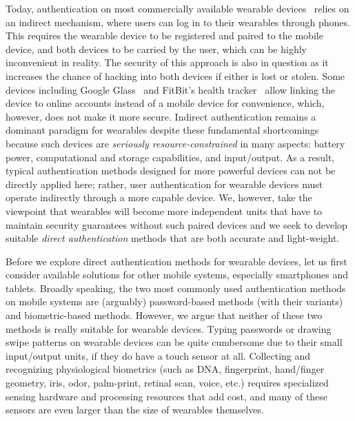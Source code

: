 \vspace{1mm}
Today, authentication on most commercially available wearable devices~\cite{fitbit, smartwatch} relies on an indirect mechanism, where users
can log in to their wearables through phones. This requires the wearable
device to be registered and paired to the mobile device, and both devices to be carried by the user, which can be highly inconvenient in reality. The security of this
approach is also in question as it increases the chance of hacking into both
devices if either is lost or stolen. Some devices including
Google Glass~\cite{googleglass} and FitBit's health tracker~\cite{fitbit}
allow linking the device to online accounts instead of a mobile device for
convenience,  which, however, does not make it more secure. Indirect authentication
remains a
dominant paradigm for wearables despite these fundamental shortcomings because
such devices are \emph{seriously resource-constrained} in many aspects:
battery power, computational and storage capabilities, and input/output. As a result, typical authentication methods designed for more
powerful devices can not be directly applied here; rather, user authentication for wearable devices must operate indirectly
through a more capable device. We, however, take the viewpoint that wearables will become more independent
units that have to maintain security guarantees without such paired devices
and we seek to develop suitable \emph{direct authentication} methods that are
both accurate and light-weight.

Before we explore direct authentication methods for wearable devices, let us
first consider available solutions for other mobile systems, especially
smartphones and tablets. Broadly speaking, the two most commonly used
authentication methods on mobile systems are (arguably) password-based methods
(with their variants) and biometric-based methods. However, we argue that
neither of these two methods is really suitable for wearable devices. Typing
passwords or drawing swipe patterns on wearable devices can be quite
cumbersome due to their small input/output units, if they do have a touch
sensor at all. Collecting and recognizing physiological biometrics (such as
DNA, fingerprint, hand/finger geometry, iris, odor, palm-print, retinal scan,
voice, etc.) requires specialized sensing hardware and processing resources
that add cost, and many of these sensors are even larger than the size of wearables
themselves.

